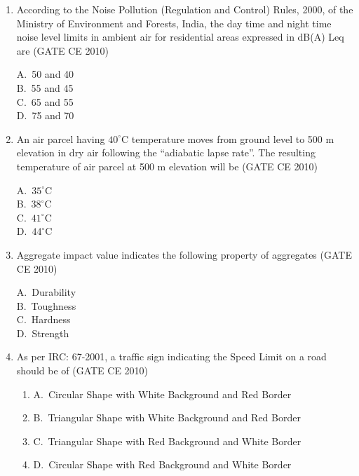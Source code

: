 \documentclass[journal,12pt,onecolumn]{exam}
\theoremstyle{remark}
\begin{document}
\begin{enumerate}
\noindent\item According to the Noise Pollution (Regulation and Control) Rules, 2000, of the Ministry of Environment and Forests, India, the day time and night time noise level limits in ambient air for residential areas expressed in dB(A) Leq are
\hfill{(GATE CE 2010)}
\begin{multicols}{4}
A.\ 50 and 40 \\
B.\ 55 and 45 \\
C.\ 65 and 55 \\
D.\ 75 and 70
\end{multicols}

\setlength{\parindent}{0pt}
\setlength{\parskip}{0.5cm}


\noindent\item An air parcel having $40^\circ\mathrm{C}$ temperature moves from ground level to 500 m elevation in dry air following the ``adiabatic lapse rate''. The resulting temperature of air parcel at 500 m elevation will be
\hfill{(GATE CE 2010)}
\begin{multicols}{4}
A.\ $35^\circ\mathrm{C}$ \\
B.\ $38^\circ\mathrm{C}$ \\
C.\ $41^\circ\mathrm{C}$ \\
D.\ $44^\circ\mathrm{C}$
\end{multicols}

\noindent\item Aggregate impact value indicates the following property of aggregates
\hfill{(GATE CE 2010)}
\begin{multicols}{4}
A.\ Durability \\
B.\ Toughness \\
C.\ Hardness \\
D.\ Strength
\end{multicols}

\noindent\item As per IRC: 67-2001, a traffic sign indicating the Speed Limit on a road should be of               
\hfill{(GATE CE 2010)}
\begin{enumerate}[label=]
    
\item A.\ Circular Shape with White Background and Red Border \\
\item B.\ Triangular Shape with White Background and Red Border \\
\item C.\ Triangular Shape with Red Background and White Border \\
\item D.\ Circular Shape with Red Background and White Border
\end{enumerate}


\end{enumerate}
\end{document}

